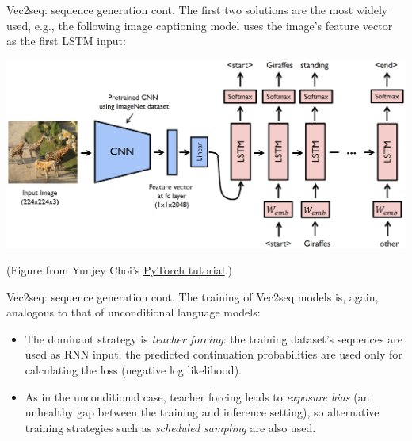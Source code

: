 \documentclass[style=upen, size=14pt]{powerdot}
\theoremstyle{definition}
\begin{document}
\begin{slide}[toc=]{Vec2seq: sequence generation cont.}
  The first two solutions are the most widely used, e.g., the following image
  captioning model uses the image's feature vector as the first LSTM
  input:\medskip
  
  \includegraphics[width=1.\textwidth]{figures/image_captioning.eps}
  
  \hspace{2.6cm}\footnotesize{(Figure from Yunjey Choi's
    \href{https://github.com/yunjey/pytorch-tutorial/tree/master/tutorials/03-advanced/image_captioning}{PyTorch
      tutorial}.)}
\end{slide}

\begin{slide}[toc=]{Vec2seq: sequence generation cont.}
  The training of Vec2seq models is, again, analogous to that of unconditional
  language models:
  \begin{itemize}
  \item The dominant strategy is \emph{teacher forcing}: the training dataset's
    sequences are used as RNN input, the predicted continuation probabilities
    are used only for calculating the loss (negative log likelihood).
  \item As in the unconditional case, teacher forcing leads to \emph{exposure
      bias} (an unhealthy gap between the training and inference setting), so
    alternative training strategies such as \emph{scheduled sampling} are also
    used.
  \end{itemize}
\end{slide}
\end{document}
